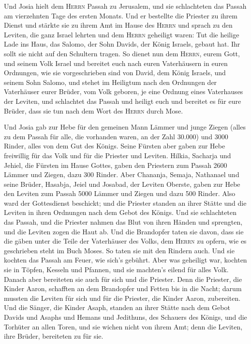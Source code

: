  Und Josia hielt dem \textsc{Herrn} Passah zu Jerusalem,
und sie schlachteten das Passah am vierzehnten Tage des ersten Monats.
 Und er bestellte die Priester zu ihrem Dienst und stärkte
sie zu ihrem Amt im Hause des \textsc{Herrn}  und sprach
zu den Leviten, die ganz Israel lehrten und dem \textsc{Herrn} geheiligt
waren: Tut die heilige Lade ins Haus, das Salomo, der Sohn Davids, der
König Israels, gebaut hat. Ihr sollt sie nicht auf den Schultern tragen.
So dienet nun dem \textsc{Herrn}, eurem Gott, und seinem Volk Israel
 und bereitet euch nach euren Vaterhäusern in euren
Ordnungen, wie sie vorgeschrieben sind von David, dem König Israels, und
seinem Sohn Salomo,  und stehet im Heiligtum nach den
Ordnungen der Vaterhäuser eurer Brüder, vom Volk geboren, je eine
Ordnung eines Vaterhauses der Leviten,  und schlachtet das
Passah und heiligt euch und bereitet es für eure Brüder, dass sie tun
nach dem Wort des \textsc{Herrn} durch Mose.

 Und Josia gab zur Hebe für den gemeinen Mann Lämmer und
junge Ziegen (alles zu dem Passah für alle, die vorhanden waren, an der
Zahl 30.000) und 3000 Rinder, alles von dem Gut des Königs.
 Seine Fürsten aber gaben zur Hebe freiwillig für das Volk
und für die Priester und Leviten. Hilkia, Sacharja und Jehiel, die
Fürsten im Hause Gottes, gaben den Priestern zum Passah 2600 Lämmer und
Ziegen, dazu 300 Rinder.  Aber Chananja, Semaja, Nathanael
und seine Brüder, Hasabja, Jeiel und Josabad, der Leviten Oberste, gaben
zur Hebe den Leviten zum Passah 5000 Lämmer und Ziegen und dazu 500
Rinder.  Also ward der Gottesdienst beschickt; und die
Priester standen an ihrer Stätte und die Leviten in ihren Ordnungen nach
dem Gebot des Königs.  Und sie schlachteten das Passah,
und die Priester nahmen das Blut von ihren Händen und sprengten, und die
Leviten zogen die Haut ab.  Und die Brandopfer taten sie
davon, dass sie die gäben unter die Teile der Vaterhäuser des Volks, dem
\textsc{Herrn} zu opfern, wie es geschrieben steht im Buch Moses. So
taten sie mit den Rindern auch.  Und sie kochten das
Passah am Feuer, wie sich's gebührt. Aber was geheiligt war, kochten sie
in Töpfen, Kesseln und Pfannen, und sie machten's eilend für alles Volk.
 Danach aber bereiteten sie auch für sich und die
Priester. Denn die Priester, die Kinder Aaron, schafften an dem
Brandopfer und Fetten bis in die Nacht; darum mussten die Leviten für
sich und für die Priester, die Kinder Aaron, zubereiten. 
Und die Sänger, die Kinder Asaph, standen an ihrer Stätte nach dem Gebot
Davids und Asaphs und Hemans und Jedithuns, des Schauers des Königs, und
die Torhüter an allen Toren, und sie wichen nicht von ihrem Amt; denn
die Leviten, ihre Brüder, bereiteten zu für sie.


